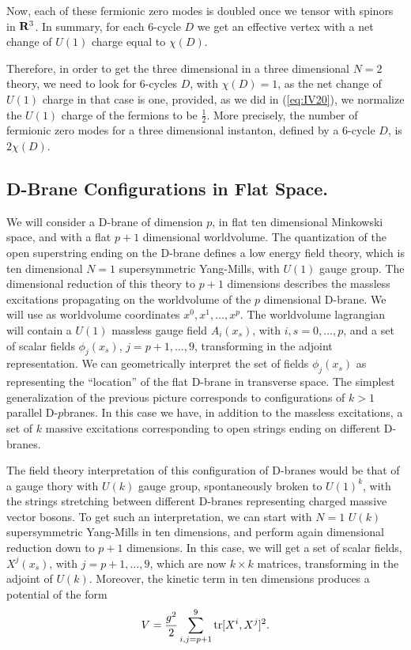 Now, each of these fermionic zero modes is doubled once we tensor
with spinors in ${\bf R}^3$. In summary, for each $6$-cycle $D$
we get an effective vertex with a net change of $U(1)$ charge
equal to $\chi(D)$.
  
Therefore, in order to get the three dimensional in a three
dimensional $N=2$ theory, we need to look for $6$-cycles $D$,
with $\chi(D)=1$, as the net change of $U(1)$ charge in that case
is one, provided, as we did in (\ref{eq:IV20}), we normalize the
$U(1)$ charge of the fermions to be $\frac {1}{2}$. More
precisely, the number of fermionic zero modes for a three
dimensional instanton, defined by a $6$-cycle $D$, is $2
\chi(D)$.



\subsection{D-Brane Configurations in Flat Space.}

We will consider a D-brane of dimension $p$, in flat ten 
dimensional Minkowski space, and with a flat $p+1$ dimensional
worldvolume. The quantization of the open superstring ending on
the D-brane defines a low energy field theory, which is ten
dimensional $N=1$ supersymmetric Yang-Mills, with $U(1)$ gauge
group. The dimensional reduction of this theory to $p+1$
dimensions describes the massless excitations propagating on the
worldvolume of the $p$ dimensional D-brane. We will use as
worldvolume coordinates $x^0,x^1,\ldots,x^p$. The worldvolume
lagrangian will contain a $U(1)$ massless gauge field $A_i(x_s)$,
with $i,s=0,\ldots,p$, and a set of scalar fields $\phi_j(x_s)$,
$j=p+1,\ldots,9$, transforming in the adjoint representation. We
can geometrically interpret the set of fields $\phi_j(x_s)$ as
representing the ``location'' of the flat D-brane in transverse space. The simplest
generalization of the previous picture corresponds to
configurations of $k>1$ parallel D-$p$branes. In this case we have,
in addition to the massless excitations, a set of $k$ 
massive excitations corresponding to open strings
ending on different D-branes.
  
The field theory interpretation of this configuration of D-branes
would be that of a gauge thory with $U(k)$ gauge group, spontaneously broken to
$U(1)^k$, with the strings stretching between different D-branes
representing charged massive vector bosons. To get such an interpretation, we can
start with $N=1$ $U(k)$ supersymmetric Yang-Mills in ten
dimensions, and perform again dimensional reduction down to $p+1$
dimensions. In this case, we will get a set of scalar fields,
$X^{j}(x_s)$, with $j=p+1,\ldots,9$, which are now $k \times k$
matrices, transforming in the adjoint of $U(k)$. Moreover, the
kinetic term in ten dimensions produces a potential of the form
\begin{equation}
V= \frac {g^2}{2} \sum_{i,j=p+1}^9 \hbox {tr} [X^i,X^j]^2.
\label{eq:d1}
\end{equation}
  
